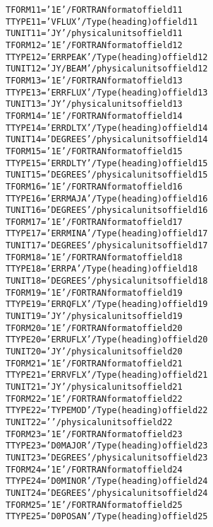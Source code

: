 \documentclass[twoside]{article}
\begin{document}
\begin{alltt}
TFORM11 = '1E      '           / FORTRAN format of field 11
TTYPE11 = 'V FLUX          '   / Type (heading) of field 11
TUNIT11 = 'JY      '           / physical units of field 11
TFORM12 = '1E      '           / FORTRAN format of field 12
TTYPE12 = 'ERR PEAK        '   / Type (heading) of field 12
TUNIT12 = 'JY/BEAM '           / physical units of field 12
TFORM13 = '1E      '           / FORTRAN format of field 13
TTYPE13 = 'ERR FLUX        '   / Type (heading) of field 13
TUNIT13 = 'JY      '           / physical units of field 13
TFORM14 = '1E      '           / FORTRAN format of field 14
TTYPE14 = 'ERR DLTX        '   / Type (heading) of field 14
TUNIT14 = 'DEGREES '           / physical units of field 14
TFORM15 = '1E      '           / FORTRAN format of field 15
TTYPE15 = 'ERR DLTY        '   / Type (heading) of field 15
TUNIT15 = 'DEGREES '           / physical units of field 15
TFORM16 = '1E      '           / FORTRAN format of field 16
TTYPE16 = 'ERR MAJA        '   / Type (heading) of field 16
TUNIT16 = 'DEGREES '           / physical units of field 16
TFORM17 = '1E      '           / FORTRAN format of field 17
TTYPE17 = 'ERR MINA        '   / Type (heading) of field 17
TUNIT17 = 'DEGREES '           / physical units of field 17
TFORM18 = '1E      '           / FORTRAN format of field 18
TTYPE18 = 'ERR PA          '   / Type (heading) of field 18
TUNIT18 = 'DEGREES '           / physical units of field 18
TFORM19 = '1E      '           / FORTRAN format of field 19
TTYPE19 = 'ERR QFLX        '   / Type (heading) of field 19
TUNIT19 = 'JY      '           / physical units of field 19
TFORM20 = '1E      '           / FORTRAN format of field 20
TTYPE20 = 'ERR UFLX        '   / Type (heading) of field 20
TUNIT20 = 'JY      '           / physical units of field 20
TFORM21 = '1E      '           / FORTRAN format of field 21
TTYPE21 = 'ERR VFLX        '   / Type (heading) of field 21
TUNIT21 = 'JY      '           / physical units of field 21
TFORM22 = '1E      '           / FORTRAN format of field 22
TTYPE22 = 'TYPE MOD        '   / Type (heading) of field 22
TUNIT22 = '        '           / physical units of field 22
TFORM23 = '1E      '           / FORTRAN format of field 23
TTYPE23 = 'D0 MAJOR        '   / Type (heading) of field 23
TUNIT23 = 'DEGREES '           / physical units of field 23
TFORM24 = '1E      '           / FORTRAN format of field 24
TTYPE24 = 'D0 MINOR        '   / Type (heading) of field 24
TUNIT24 = 'DEGREES '           / physical units of field 24
TFORM25 = '1E      '           / FORTRAN format of field 25
TTYPE25 = 'D0 POSAN        '   / Type (heading) of field 25

\end{alltt}
\end{document}
